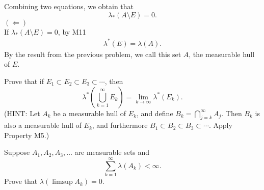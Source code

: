\documentclass[answers]{exam}
\begin{document}
\begin{questions}
\begin{solution}
   Combining two equations, we obtain that
   $$
   \lambda_{*}\left(A\setminus E\right) = 0.
   $$
   $\left(\Leftarrow\right)$\\
   If $\lambda_{*}\left(A\setminus E\right) = 0$, by M11
   \begin{align*}
   \lambda^{*}\left(E\right) = \lambda\left(A\right).
   \end{align*}
   By the result from the previous problem, we call this set $A$, the measurable hull of $E$.
   \end{solution}
   \question
   Prove that if $E_{1} \subset E_{2} \subset E_{3} \subset \cdots $, then
   $$
   \lambda^{*}\left(\bigcup_{k=1}^{\infty}E_{k} \right) = \lim_{k\to\infty}\lambda^{*}\left(E_{k}\right).
   $$
   (HINT: Let $A_{k}$ be a measurable hull of $E_{k}$, and define $B_{k}=\bigcap_{j=k}^{\infty}A_{j}$. Then $B_{k}$ is also a measurable hull of $E_{k}$, and furthermore $B_{1} \subset B_{2} \subset B_{3} \subset \cdots$. Apply Property M5.)
   \begin{solution}

   \end{solution}
   \question
   Suppose $A_{1}, A_{2}, A_{3}, \ldots$ are measurable sets and
   $$
   \sum_{k=1}^{\infty}\lambda\left(A_{k}\right) <\infty.
   $$
   Prove that $\lambda\left(\limsup A_{k}\right) = 0$.
   \begin{solution}

   \end{solution}
\end{questions}
\end{document}
